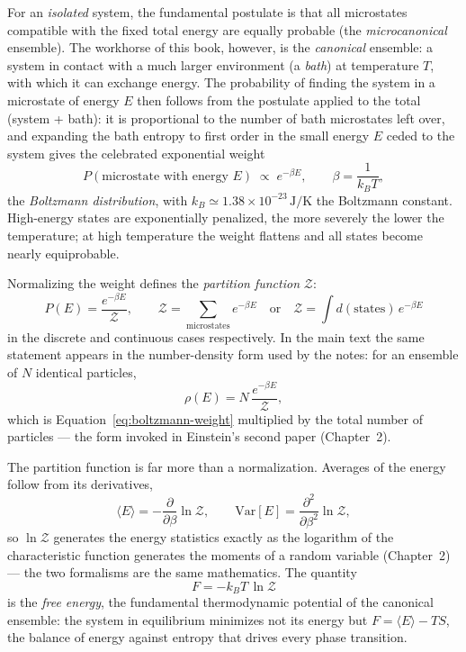 For an \emph{isolated} system, the fundamental postulate is that all microstates compatible with the fixed total energy are equally probable (the \emph{microcanonical} ensemble).
The workhorse of this book, however, is the \emph{canonical} ensemble: a system in contact with a much larger environment (a \emph{bath}) at temperature $T$, with which it can exchange energy.
The probability of finding the system in a microstate of energy $E$ then follows from the postulate applied to the total (system + bath): it is proportional to the number of bath microstates left over, and expanding the bath entropy to first order in the small energy $E$ ceded to the system gives the celebrated exponential weight
\begin{equation}\label{eq:boltzmann-weight}
P(\text{microstate with energy } E) \;\propto\; e^{-\beta E},
\qquad
\beta = \frac{1}{k_B T},
\end{equation}
the \emph{Boltzmann distribution}, with $k_B \simeq 1.38\times10^{-23}\,\mathrm{J/K}$ the Boltzmann constant.
High-energy states are exponentially penalized, the more severely the lower the temperature; at high temperature the weight flattens and all states become nearly equiprobable.

Normalizing the weight defines the \emph{partition function} $\mathcal{Z}$:
\begin{equation}\label{eq:partition-function}
P(E) = \frac{e^{-\beta E}}{\mathcal{Z}},
\qquad
\mathcal{Z} = \sum_{\text{microstates}} e^{-\beta E}
\quad\text{or}\quad
\mathcal{Z} = \int d(\text{states})\, e^{-\beta E}
\end{equation}
in the discrete and continuous cases respectively.
In the main text the same statement appears in the number-density form used by the notes: for an ensemble of $N$ identical particles,
\begin{equation}\label{eq:boltzmann-density}
\rho(E) = N\,\frac{e^{-\beta E}}{\mathcal{Z}},
\end{equation}
which is Equation~\eqref{eq:boltzmann-weight} multiplied by the total number of particles --- the form invoked in Einstein's second paper (Chapter~2).

The partition function is far more than a normalization.
Averages of the energy follow from its derivatives,
\begin{equation}\label{eq:z-derivatives}
\langle E\rangle = -\frac{\partial}{\partial\beta}\ln\mathcal{Z},
\qquad
\mathrm{Var}[E] = \frac{\partial^2}{\partial\beta^2}\ln\mathcal{Z},
\end{equation}
so $\ln\mathcal{Z}$ generates the energy statistics exactly as the logarithm of the characteristic function generates the moments of a random variable (Chapter~2) --- the two formalisms are the same mathematics.
The quantity
\begin{equation}\label{eq:free-energy}
F = -k_B T\,\ln\mathcal{Z}
\end{equation}
is the \emph{free energy}, the fundamental thermodynamic potential of the canonical ensemble: the system in equilibrium minimizes not its energy but $F = \langle E\rangle - TS$, the balance of energy against entropy that drives every phase transition.

